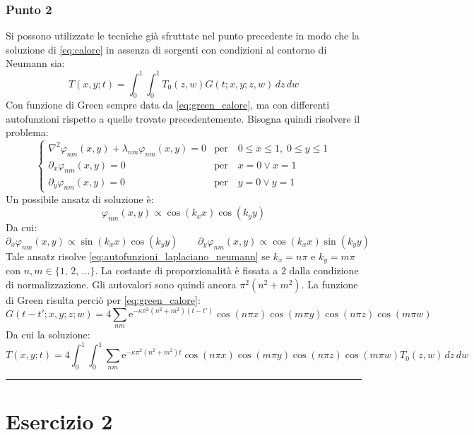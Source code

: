 \documentclass[]{scrartcl}
\newcommand{\qedsymbol}{\hfill \rule{0.7em}{0.7em}}
\newcommand{\px}{\partial_x}
\newcommand{\py}{\partial_y}
\newcommand{\lap}{\nabla^2}
\begin{document}
\subsubsection*{Punto 2}
Si possono utilizzate le tecniche già sfruttate nel punto precedente in modo che la soluzione di \eqref{eq:calore} in assenza di sorgenti con condizioni al contorno di Neumann sia:
\begin{equation}
T(x,y;t) = \int_0^1 \int_0^1 T_0(z,w) G(t;x,y;z,w)\,dz\,dw
\label{eq:sol_general_neumann}
\end{equation}
Con funzione di Green sempre data da \eqref{eq:green_calore}, ma con differenti autofunzioni rispetto a quelle trovate precedentemente. Bisogna quindi risolvere il problema:
  \begin{equation}
  \begin{cases}
  \lap \varphi_{nm}(x,y) + \lambda_{nm}\varphi_{nm}(x,y) = 0 & \text{per} \quad 0\leq x \leq 1,\; 0\leq y \leq 1  \\
  \px\varphi_{nm}(x,y) = 0 & \text{per} \quad x = 0 \vee x = 1 \\
  \py\varphi_{nm}(x,y) = 0 & \text{per} \quad y = 0 \vee y = 1  \label{eq:autofunzioni_laplaciano_neumann}
  \end{cases}{}
  \end{equation}
Un possibile ansatz di soluzione è:
\[	\varphi_{nm}(x,y) \propto \cos\left(k_x x\right)\cos\left(k_y y\right)	\]
Da cui:
\[	\px\varphi_{nm}(x,y) \propto \sin\left(k_x x\right)\cos\left(k_y y\right) \qquad \py\varphi_{nm}(x,y) \propto \cos\left(k_x x\right)\sin\left(k_y y\right)	\]
Tale ansatz risolve \eqref{eq:autofunzioni_laplaciano_neumann} se $ k_x = n\pi $ e $ k_y = m\pi $ con $ n,m \in \{1,\,2,\,\dots\} $. La costante di proporzionalità è fissata a $ 2 $ dalla condizione di normalizzazione. Gli autovalori sono quindi ancora $ \pi^2(n^2+m^2) $. La funzione di Green risulta perciò per \eqref{eq:green_calore}:
\[	G(t-t';x,y;z;w) = 4 \sum_{nm} \mathrm{e}^{-\kappa \pi^2(n^2 + m^2) (t-t')} \cos(n\pi x) \cos(m \pi y) \cos(n\pi z) \cos(m \pi w)	\]
Da cui la soluzione:
\begin{equation}
T(x,y;t) = 4 \int_0^1 \int_0^1 \sum_{nm} \mathrm{e}^{-\kappa \pi^2(n^2 + m^2) t} \cos(n\pi x) \cos(m \pi y) \cos(n\pi z) \cos(m \pi w) T_0(z,w)\,dz\,dw
\label{eq:soluz_calore_neumann}
\end{equation}
\qedsymbol
\section*{Esercizio 2}
\end{document}
